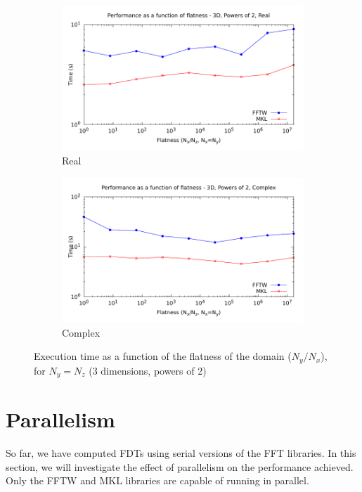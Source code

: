 \documentclass[12pt, a4paper]{article} \setlength{\textheight}{24cm}
\begin{document}
\begin{figure}[H]
  \centering
  \begin{subfigure}{.5\textwidth}
    \centering
    \includegraphics[width=.9\linewidth]{graphs/flatness-r.pdf}
    \caption{Real}
    \label{FLATNESSR}
  \end{subfigure}%
  \begin{subfigure}{.5\textwidth}
    \centering
    \includegraphics[width=.9\linewidth]{graphs/flatness-c.pdf}
    \caption{Complex}
    \label{FLATNESSC}
  \end{subfigure}
  \caption{Execution time as a function of the flatness of the domain
    ($N_y/N_x$), for $N_y=N_z$ (3 dimensions, powers of 2)}
  \label{FLATNESS}
\end{figure}

\section{Parallelism}\label{PARALLELISM}
So far, we have computed FDTs using serial versions of the FFT libraries. 
In this section, we
will investigate the effect of parallelism on the performance
achieved. Only the FFTW and MKL libraries are capable of running in
parallel.
\end{document}
